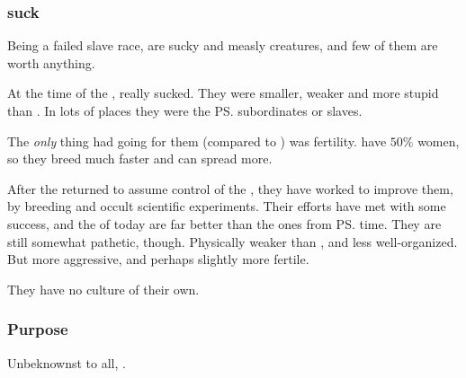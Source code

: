 \subsubsection{\Humans suck}
Being a failed slave race, \humans{} are sucky and measly creatures, and few of them are worth anything. 

At the time of the , \humans{} really sucked. 
They were smaller, weaker and more stupid than \nephilim. 
In lots of places they were the \ps{\nephilim}{} subordinates or slaves. 

The \emph{only} thing \humans{} had going for them (compared to \nephilim) was fertility. 
\Humans{} have $50\%$ women, so they breed much faster and can spread more. 

After the \resphain{} returned to assume control of the \humans, they have worked to improve them, by breeding and occult scientific experiments. 
Their efforts have met with some success, and the \humans{} of today are far better than the ones from \ps{\Merkyrah} time. 
They are still somewhat pathetic, though. 
Physically weaker than \scathae, and less well-organized. 
But more aggressive, and perhaps slightly more fertile. 


They have no culture of their own. 






\subsubsection{Purpose}
Unbeknownst to all, . 









